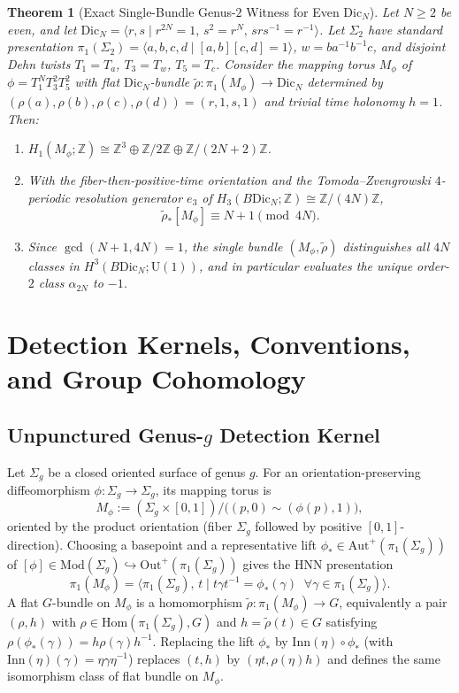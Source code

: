 \documentclass[11pt]{amsart}
\newtheorem{theorem}{Theorem}[section]
\theoremstyle{definition}
\theoremstyle{remark}
\newcommand{\Z}{\mathbb{Z}}
\newcommand{\U}{\mathrm{U}}
\newcommand{\Dic}{\mathrm{Dic}}
\newcommand{\Mod}{\mathrm{Mod}}
\newcommand{\Aut}{\mathrm{Aut}}
\newcommand{\Out}{\mathrm{Out}}
\newcommand{\Inn}{\mathrm{Inn}}
\newcommand{\Hom}{\mathrm{Hom}}
\begin{document}
\begin{theorem}[Exact Single-Bundle Genus-$2$ Witness for Even $\Dic_N$]\label{thm:even-dic}
Let $N \ge 2$ be even, and let $\Dic_N = \langle r,s \mid r^{2N}=1,\, s^2=r^N,\, srs^{-1}=r^{-1}\rangle$.
Let $\Sigma_2$ have standard presentation $\pi_1(\Sigma_2)=\langle a,b,c,d \mid [a,b][c,d]=1\rangle$, $w=ba^{-1}b^{-1}c$, and disjoint Dehn twists $T_1=T_a$, $T_3=T_w$, $T_5=T_c$.
Consider the mapping torus $M_\phi$ of $\phi = T_1^N T_3^2 T_5^2$ with flat $\Dic_N$-bundle $\tilde{\rho}\colon \pi_1(M_\phi)\to \Dic_N$ determined by $(\rho(a),\rho(b),\rho(c),\rho(d))=(r,1,s,1)$ and trivial time holonomy $h=1$.
Then:
\begin{enumerate}
    \item $H_1(M_\phi;\Z) \cong \Z^3 \oplus \Z/2\Z \oplus \Z/(2N+2)\Z$.
    \item With the fiber-then-positive-time orientation and the Tomoda--Zvengrowski $4$-periodic resolution generator $e_3$ of $H_3(B\Dic_N;\Z) \cong \Z/(4N)\Z$,
    \[
        \tilde{\rho}_*[M_\phi] \equiv N + 1 \pmod{4N}.
    \]
    \item Since $\gcd(N+1,4N)=1$, the single bundle $(M_\phi,\tilde{\rho})$ distinguishes all $4N$ classes in $H^3(B\Dic_N;\U(1))$, and in particular evaluates the unique order-$2$ class $\alpha_{2N}$ to $-1$.
\end{enumerate}
\end{theorem}

\section{Detection Kernels, Conventions, and Group Cohomology}

\subsection{Unpunctured Genus-$g$ Detection Kernel}
Let $\Sigma_g$ be a closed oriented surface of genus $g$. For an orientation-preserving diffeomorphism $\phi\colon \Sigma_g \to \Sigma_g$, its mapping torus is
\[
    M_\phi := (\Sigma_g \times [0,1]) \big/ \big((p,0) \sim (\phi(p),1)\big),
\]
oriented by the product orientation (fiber $\Sigma_g$ followed by positive $[0,1]$-direction).
Choosing a basepoint and a representative lift $\phi_*\in \Aut^+(\pi_1(\Sigma_g))$ of $[\phi]\in \Mod(\Sigma_g) \hookrightarrow \Out^+(\pi_1(\Sigma_g))$ gives the HNN presentation
\[
    \pi_1(M_\phi) = \bigl\langle \pi_1(\Sigma_g),\, t \;\big|\; t\gamma t^{-1} = \phi_*(\gamma) \;\;\forall \gamma\in \pi_1(\Sigma_g)\bigr\rangle.
\]
A flat $G$-bundle on $M_\phi$ is a homomorphism $\tilde{\rho}\colon \pi_1(M_\phi)\to G$, equivalently a pair $(\rho, h)$ with $\rho\in \Hom(\pi_1(\Sigma_g),G)$ and $h=\tilde{\rho}(t)\in G$ satisfying $\rho(\phi_*(\gamma)) = h\rho(\gamma)h^{-1}$.
Replacing the lift $\phi_*$ by $\Inn(\eta)\circ\phi_*$ (with $\Inn(\eta)(\gamma)=\eta\gamma\eta^{-1}$) replaces $(t,h)$ by $(\eta t, \rho(\eta)h)$ and defines the same isomorphism class of flat bundle on $M_\phi$.
\end{document}
